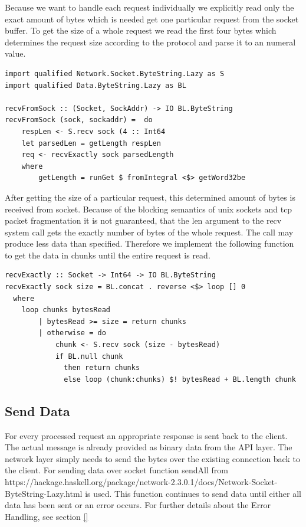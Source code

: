 Because we want to handle each request individually we explicitly read
only the exact amount of bytes which is needed get one particular request from
the socket buffer. To get the size of a whole request we read the first four
bytes which determines the request size according to the protocol and parse it
to an numeral value.

\begin{lstlisting}[caption={Receiving data from socket}]
import qualified Network.Socket.ByteString.Lazy as S 
import qualified Data.ByteString.Lazy as BL

recvFromSock :: (Socket, SockAddr) -> IO BL.ByteString
recvFromSock (sock, sockaddr) =  do 
    respLen <- S.recv sock (4 :: Int64
    let parsedLen = getLength respLen
    req <- recvExactly sock parsedLength 
    where
        getLength = runGet $ fromIntegral <$> getWord32be
\end{lstlisting}

After getting the size of a particular request, this determined amount of bytes
is received from socket. Because of the blocking semantics of unix sockets and
tcp packet fragmentation it is not guaranteed, that the len argument to the recv
system call gets the exactly number of bytes of the whole request. The call may produce
less data than specified. Therefore we implement the following function to get
the data in
chunks until the entire request is read. 

\begin{lstlisting}[caption={Receive exactly amount of bytes}]
recvExactly :: Socket -> Int64 -> IO BL.ByteString 
recvExactly sock size = BL.concat . reverse <$> loop [] 0 
  where
    loop chunks bytesRead
        | bytesRead >= size = return chunks
        | otherwise = do  
            chunk <- S.recv sock (size - bytesRead)
            if BL.null chunk 
              then return chunks 
              else loop (chunk:chunks) $! bytesRead + BL.length chunk 
\end{lstlisting}

\subsection{Send Data}
\label{sec:impl-broker-socket-send}
For every processed request an appropriate response is sent back to the client.
The actual message is already provided as binary data from the API layer. The
network layer simply needs to send the bytes over the existing connection back
to the client. For sending data over socket function sendAll from 
{https://hackage.haskell.org/package/network-2.3.0.1/docs/Network-Socket-ByteString-Lazy.html}
is used. This function continues to send data until either all data has been
sent or an error occurs. For further details about the Error Handling, see
section \ref{}

